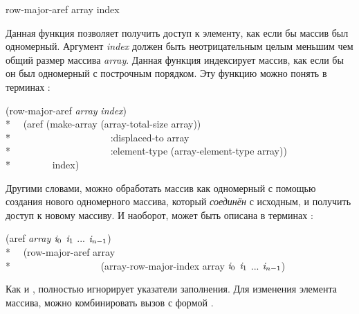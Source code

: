 \begin{defun}[Функция]
row-major-aref array index

Данная функция позволяет получить доступ к элементу, как если бы массив был
одномерный.
Аргумент \emph{index} должен быть неотрицательным целым меньшим чем общий размер
массива \emph{array}. Данная функция индексирует массив, как если бы он был
одномерный с построчным порядком.
Эту функцию можно понять в терминах :
\begin{lisp}
(row-major-aref \emph{array} \emph{index}) \EQ \\*
~~(aref (make-array (array-total-size array)) \\*
~~~~~~~~~~~~~~~~~~~~:displaced-to array \\*
~~~~~~~~~~~~~~~~~~~~:element-type (array-element-type array)) \\*
~~~~~~~~index)
\end{lisp}
Другими словами, можно обработать массив как одномерный с помощью создания
нового одномерного массива, который \emph{соединён} с исходным, и получить
доступ к новому массиву.
И наоборот,  может быть описана в терминах :
\begin{lisp}
(aref \emph{array} $\emph{i}_0$ $\emph{i}_1$ ... $\emph{i}_{n-1}$) \EQ \\*
~~(row-major-aref array \\*
~~~~~~~~~~~~~~~~~~(array-row-major-index array $\emph{i}_0$ $\emph{i}_1$ ... $\emph{i}_{n-1}$)
\end{lisp}

Как и ,  полностью игнорирует указатели
заполнения.
Для изменения элемента массива, можно комбинировать вызов  с
формой .


\end{defun}
